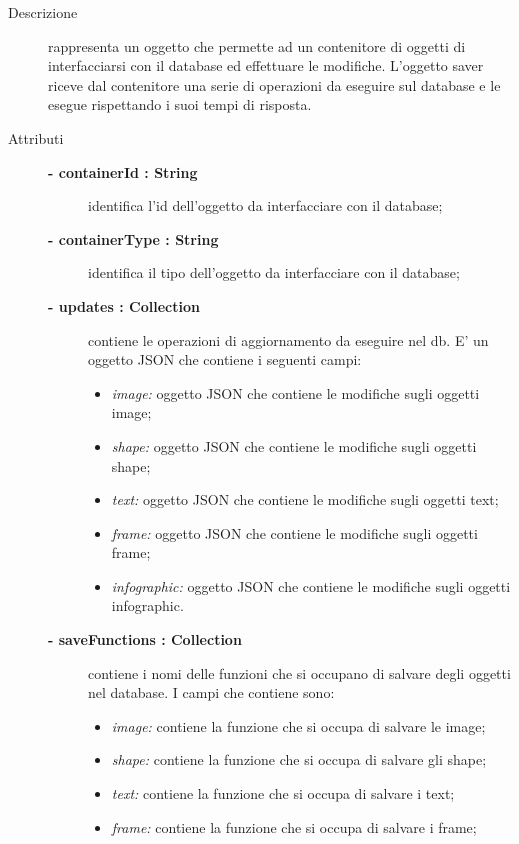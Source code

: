 \begin{description}
\item[Descrizione] \hfill
	rappresenta un oggetto che permette ad un contenitore di oggetti di interfacciarsi con il database ed effettuare le modifiche. L'oggetto saver riceve dal contenitore una serie di operazioni da eseguire sul database e le esegue rispettando i suoi tempi di risposta.
	
	
\item[Attributi] \hfill
	\begin{description}
		\item[\textbf{- containerId : String			}] \hfill
			identifica l'id dell'oggetto da interfacciare con il database;
		\item[\textbf{- containerType : String			}] \hfill
			identifica il tipo dell'oggetto da interfacciare con il database;
		\item[\textbf{- updates : Collection			}] \hfill
			contiene le operazioni di aggiornamento da eseguire nel db. E' un oggetto JSON che contiene i seguenti campi:
			\begin{itemize}
				\item \textit{image:} oggetto JSON che contiene le modifiche sugli oggetti image;
				\item \textit{shape:} oggetto JSON che contiene le modifiche sugli oggetti shape;
				\item \textit{text:} oggetto JSON che contiene le modifiche sugli oggetti text;
				\item \textit{frame:} oggetto JSON che contiene le modifiche sugli oggetti frame;
				\item \textit{infographic:} oggetto JSON che contiene le modifiche sugli oggetti infographic.
			\end{itemize}
		\item[\textbf{- saveFunctions : Collection			}] \hfill
			contiene i nomi delle funzioni che si occupano di salvare degli oggetti nel database. I campi che contiene sono:
			\begin{itemize}
				\item \textit{image:} contiene la funzione che si occupa di salvare le image;
				\item \textit{shape:} contiene la funzione che si occupa di salvare gli shape;
				\item \textit{text:} contiene la funzione che si occupa di salvare i text;
				\item \textit{frame:} contiene la funzione che si occupa di salvare i frame;

\end{itemize}
\end{description}
\end{description}
